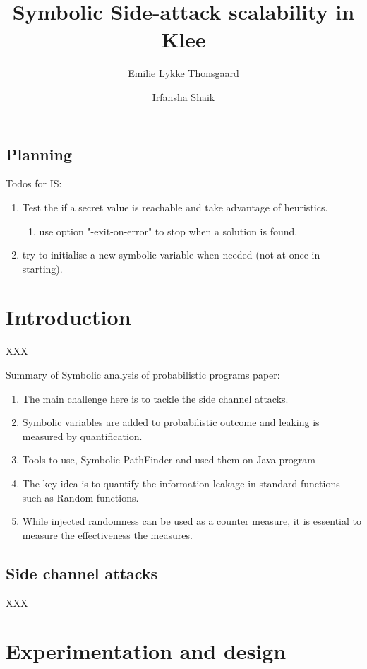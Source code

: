 \documentclass[11pt]{report}
\title{Symbolic Side-attack scalability in Klee}
\author{Emilie Lykke Thonsgaard \and Irfansha Shaik}
\begin{document}
\maketitle

\section{Planning}
\label{sec:planning}

Todos for IS:
\begin{enumerate}
\item Test the if a secret value is reachable and take advantage of heuristics.
  \begin{enumerate}
  \item use option "-exit-on-error" to stop when a solution is found.
  \end{enumerate}
\item try to initialise a new symbolic variable when needed (not at once in starting).
\end{enumerate}

\chapter{Introduction}
\label{cha:introduction}

XXX

Summary of Symbolic analysis of probabilistic programs paper:
\begin{enumerate}
\item The main challenge here is to tackle the side channel attacks.
\item Symbolic variables are added to probabilistic outcome and leaking is measured by quantification.
\item Tools to use, Symbolic PathFinder and used them on Java program
\item The key idea is to quantify the information leakage in standard functions such as Random functions.
\item While injected randomness can be used as a counter measure, it is essential to measure the effectiveness the measures.
\end{enumerate}

\section{Side channel attacks}
\label{sec:sidechannelattacks}

XXX

\chapter{Experimentation and design}
\label{cha:experimentationanddesign}
\end{document}
